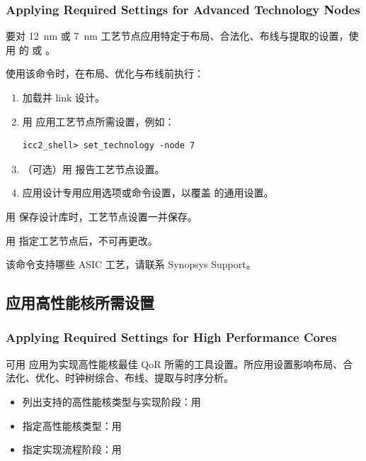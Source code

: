 \subsubsection*{Applying Required Settings for Advanced Technology Nodes}

要对 12~nm 或 7~nm 工艺节点应用特定于布局、合法化、布线与提取的设置，使用  的  或 。

使用该命令时，在布局、优化与布线前执行：
\begin{enumerate}
  \item 加载并 link 设计。
  \item 用  应用工艺节点所需设置，例如：
\begin{lstlisting}
icc2_shell> set_technology -node 7
\end{lstlisting}
  \item （可选）用  报告工艺节点设置。
  \item 应用设计专用应用选项或命令设置，以覆盖  的通用设置。
\end{enumerate}

用  保存设计库时，工艺节点设置一并保存。

\begin{noteBox}
用  指定工艺节点后，不可再更改。
\end{noteBox}

该命令支持哪些 ASIC 工艺，请联系 Synopsys Support。

\subsection{应用高性能核所需设置}
\subsubsection*{Applying Required Settings for High Performance Cores}

可用  应用为实现高性能核最佳 QoR 所需的工具设置。所应用设置影响布局、合法化、优化、时钟树综合、布线、提取与时序分析。

\begin{itemize}
  \item 列出支持的高性能核类型与实现阶段：用 
  \item 指定高性能核类型：用 
  \item 指定实现流程阶段：用 
\end{itemize}

